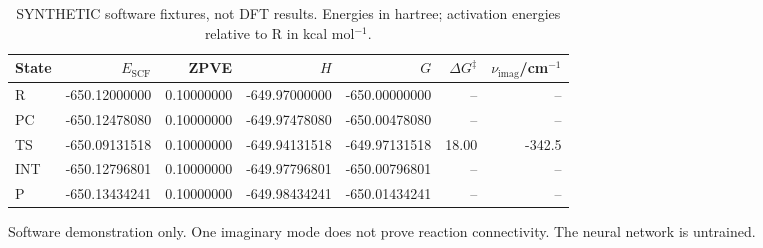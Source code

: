 \documentclass[10pt,landscape]{article}
\begin{document}
\begin{table}[htbp]
\centering
\caption{SYNTHETIC software fixtures, not DFT results. Energies in hartree; activation energies relative to R in kcal mol$^{-1}$.}
\label{tab:qm-autobridge}
\begin{tabular}{lrrrrrr}
\toprule
State & $E_{\mathrm{SCF}}$ & ZPVE & $H$ & $G$ & $\Delta G^\ddagger$ & $\nu_{\mathrm{imag}}$/cm$^{-1}$ \\
\midrule
R & -650.12000000 & 0.10000000 & -649.97000000 & -650.00000000 & -- & -- \\
PC & -650.12478080 & 0.10000000 & -649.97478080 & -650.00478080 & -- & -- \\
TS & -650.09131518 & 0.10000000 & -649.94131518 & -649.97131518 & 18.00 & -342.5 \\
INT & -650.12796801 & 0.10000000 & -649.97796801 & -650.00796801 & -- & -- \\
P & -650.13434241 & 0.10000000 & -649.98434241 & -650.01434241 & -- & -- \\
\bottomrule
\end{tabular}
\end{table}
\noindent Software demonstration only. One imaginary mode does not prove reaction connectivity. The neural network is untrained.
\end{document}
